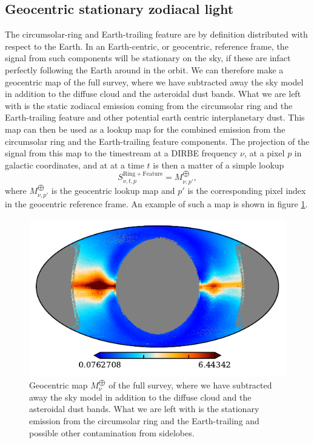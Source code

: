\documentclass{aa}
\begin{document}
\subsection{Geocentric stationary zodiacal light}
The circumsolar-ring and Earth-trailing feature are by definition distributed with respect to the Earth. In an Earth-centric, or geocentric, reference frame, the signal from such components will be stationary on the sky, if these are infact perfectly following the Earth around in the orbit. 
We can therefore make a geocentric map of the full survey, where we have subtracted away the sky model in addition to the diffuse cloud and the asteroidal dust bands. What we are left with is the static zodiacal emission coming from the circumsolar ring and the Earth-trailing feature and other potential earth centric interplanetary dust. 
This map can then be used as a lookup map for the combined emission from the circumsolar ring and the Earth-trailing feature components. The projection of the signal from this map to the timestream at a DIRBE frequency $\nu$, at a pixel $p$ in galactic coordinates, and at at a time $t$ is then a matter of a simple lookup
\begin{equation}
    S_{\nu, t, p}^{\mathrm{Ring + Feature}} = M^{\bigoplus}_{\nu, p'},
\end{equation}
where $M^{\bigoplus}_{\nu, p'}$ is the geocentric lookup map and $p'$ is the corresponding pixel index in the geocentric reference frame. An example of such a map is shown in figure \ref{fig: geomap}.
\begin{figure}
    \centering
    \includegraphics[width=\columnwidth]{figs/zodi_static.pdf}
    \caption{Geocentric map $M^{\bigoplus}_\nu$ of the full survey, where we have subtracted away the sky model in addition to the diffuse cloud and the asteroidal dust bands. What we are left with is the stationary emission from the circumsolar ring and the Earth-trailing and possible other contamination from sidelobes.}
    \label{fig: geomap}
\end{figure}
\end{document}
